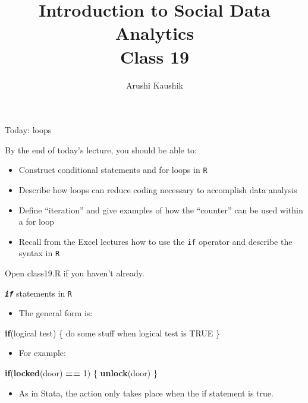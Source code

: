 \documentclass[ignorenonframetext,]{beamer}
\title[Class 19]{Introduction to Social Data Analytics\\
	Class 19}
\author[Kaushik]{Arushi Kaushik}
\institute[UCSD]{arkaushi@ucsd.edu}
\newenvironment{Shaded}{\begin{snugshade}}{\end{snugshade}}
\newcommand{\KeywordTok}[1]{\textcolor[rgb]{0.13,0.29,0.53}{\textbf{#1}}}
\newcommand{\DecValTok}[1]{\textcolor[rgb]{0.00,0.00,0.81}{#1}}
\newcommand{\StringTok}[1]{\textcolor[rgb]{0.31,0.60,0.02}{#1}}
\newcommand{\OtherTok}[1]{\textcolor[rgb]{0.56,0.35,0.01}{#1}}
\newcommand{\ControlFlowTok}[1]{\textcolor[rgb]{0.13,0.29,0.53}{\textbf{#1}}}
\newcommand{\OperatorTok}[1]{\textcolor[rgb]{0.81,0.36,0.00}{\textbf{#1}}}
\newcommand{\NormalTok}[1]{#1}
\providecommand{\tightlist}{%
	\setlength{\itemsep}{0pt}\setlength{\parskip}{0pt}}
\begin{document}
\frame{\titlepage}

\begin{frame}[fragile]{Today: loops}

By the end of today's lecture, you should be able to:

\begin{itemize}
\tightlist
\item
  Construct conditional statements and for loops in \texttt{R}
\item
  Describe how loops can reduce coding necessary to accomplish data
  analysis
\item
  Define ``iteration'' and give examples of how the ``counter'' can be
  used within a for loop
\item
  Recall from the Excel lectures how to use the \texttt{if} operator and
  describe the syntax in \texttt{R}
\end{itemize}

Open class19.R if you haven't already.

\end{frame}

\begin{frame}[fragile]{\textbf{\emph{\texttt{if}}} statements in
\texttt{R}}

\begin{itemize}
\tightlist
\item
  The general form is:
\end{itemize}

\begin{Shaded}
\begin{Highlighting}[]
\ControlFlowTok{if}\NormalTok{(logical test) \{}
\NormalTok{  do some stuff when logical test is }\OtherTok{TRUE}
\NormalTok{\} }
\end{Highlighting}
\end{Shaded}

\begin{itemize}
\tightlist
\item
  For example:
\end{itemize}

\begin{Shaded}
\begin{Highlighting}[]
\ControlFlowTok{if}\NormalTok{(}\KeywordTok{locked}\NormalTok{(door) }\OperatorTok{==}\StringTok{ }\DecValTok{1}\NormalTok{) \{}
  \KeywordTok{unlock}\NormalTok{(door)}
\NormalTok{\} }
\end{Highlighting}
\end{Shaded}

\begin{itemize}
\tightlist
\item
  As in Stata, the action only takes place when the if statement is
  true.
\end{itemize}

\end{frame}
\end{document}
